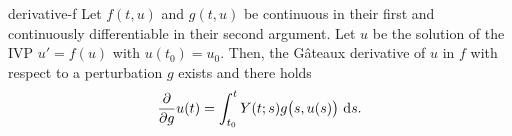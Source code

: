 \begin{Theorem}{derivative-f}
  Let $f(t,u)$ and $g(t,u)$ be continuous in their first and
  continuously differentiable in their second argument. Let $u$ be the
  solution of the IVP $u'=f(u)$ with $u(t_0) = u_0$. Then, the Gâteaux
  derivative of $u$ in $f$ with respect to a perturbation $g$ exists
  and there holds
  \begin{gather}
    \label{eq:derivative-f:1}
    \frac{\partial}{\partial g} u(t)
    = \int_{t_0}^t \fundamental(t;s) g\bigl(s,u(s)\bigr)\, \ds.
  \end{gather}
\end{Theorem}
